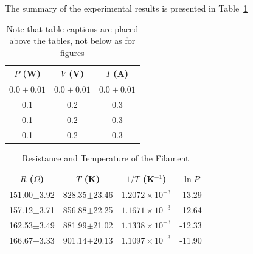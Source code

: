 \documentclass[11pt, a4paper]{article}
\begin{document}
%


The summary of the experimental results is presented in Table~\ref{tab:summary}

\begin{table}[htbp]
\caption{Note that table captions are placed above the tables, not below as for figures}
\label{tab:summary}
\begin{center}
\begin{tabular}{ccc}
\hline
 $P$ (W)      & $V$ (V)       & $I$ (A)   \\
\hline
$0.0\pm0.01$ & $0.0\pm0.01$ & $0.0\pm0.01$  \\
 0.1         & 0.2          &  0.3         \\
 0.1         & 0.2          &  0.3         \\
 0.1         & 0.2          &  0.3         \\

\hline
\end{tabular}
\end{center}
\end{table}


\begin{table}[htbp]
\caption{Resistance and Temperature of the Filament}
\label{tab:data}
\begin{center}
\begin{tabular}{|c||c|c|c|}
\hline
$R$ ($\Omega$) & $T$ (K) & $1/T$ (K$^{-1}$) & $\ln P$ \\
\hline\hline
151.00$\pm$3.92 & 828.35$\pm$23.46& $1.2072\times10^{-3}$& -13.29 \\ \hline
157.12$\pm$3.71 & 856.88$\pm$22.25& $1.1671\times10^{-3}$& -12.64 \\ \hline
162.53$\pm$3.49 & 881.99$\pm$21.02& $1.1338\times10^{-3}$& -12.33 \\ \hline
166.67$\pm$3.33 & 901.14$\pm$20.13& $1.1097\times10^{-3}$& -11.90 \\ \hline
\hline
\end{tabular}
\end{center}
\end{table}
\end{document}
